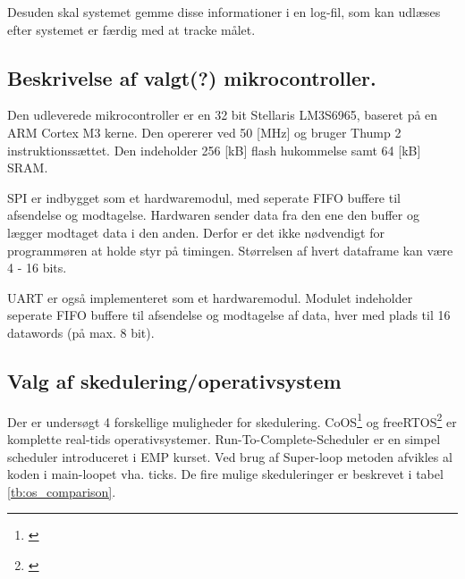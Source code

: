 
Desuden skal systemet gemme disse informationer i en log-fil, som kan udlæses efter systemet er færdig med at tracke målet. 


\subsection{Beskrivelse af valgt(?) mikrocontroller.}
Den udleverede mikrocontroller er en 32 bit Stellaris LM3S6965, baseret på en ARM Cortex M3 kerne. Den opererer ved 50 [MHz] og bruger Thump 2 instruktionssættet. Den indeholder 256 [kB] flash hukommelse samt 64 [kB] SRAM. 
\citep{lm3s6965}

SPI er indbygget som et hardwaremodul, med seperate FIFO buffere til afsendelse og modtagelse. Hardwaren sender data fra den ene den buffer og lægger modtaget data i den anden. Derfor er det ikke nødvendigt for programmøren at holde styr på timingen. Størrelsen af hvert dataframe kan være 4 - 16 bits. 

UART er også implementeret som et hardwaremodul. Modulet indeholder seperate FIFO buffere til afsendelse og modtagelse af data, hver med plads til 16 datawords (på max. 8 bit). 


\subsection{Valg af skedulering/operativsystem}
Der er undersøgt 4 forskellige muligheder for skedulering. CoOS\footnote{\citep{www.coocox.com/CoOS.htm}} og freeRTOS\footnote{\citep{freertos.org}} er komplette real-tids operativsystemer. 
Run-To-Complete-Scheduler er en simpel scheduler introduceret i EMP kurset. Ved brug af Super-loop metoden afvikles al koden i main-loopet vha. ticks.
De fire mulige skeduleringer er beskrevet i tabel \ref{tb:os_comparison}.


